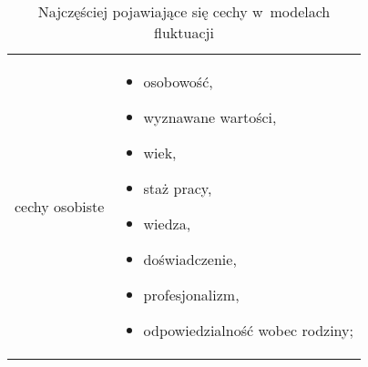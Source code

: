 \noindent\begin{minipage}{\textwidth}
             \begin{table}[H]
                 \raggedright\caption{Najczęściej pojawiające się cechy w~modelach fluktuacji\label{tabela:fluktuacja-cechy}}
                 \begin{center}
                     \begin{tabular}{|P{.2\textwidth}|P{.7\textwidth}|}

                         \hline
                          &
                          \\
                         \hline

                         cechy osobiste &
                         \begin{itemize}
                             \item osobowość,
                             \item wyznawane wartości,
                             \item wiek,
                             \item staż pracy,
                             \item wiedza,
                             \item doświadczenie,
                             \item profesjonalizm,
                             \item odpowiedzialność wobec rodziny;
                         \end{itemize} \\

                         \hline

                     \end{tabular}
                 \end{center}
                 \raggedright{}
                 \vspace{0.75cm}
             \end{table}
\end{minipage}

